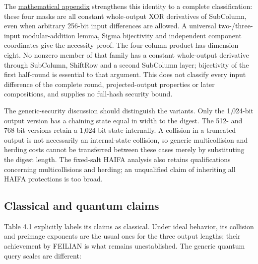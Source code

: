 \documentclass[
  english,
  11pt,
  a4paper,
]{article}
\begin{document}
The \href{SUBCOLUMN_STRUCTURES.md}{mathematical appendix} strengthens
this identity to a complete classification: these four masks are all
constant whole-output XOR derivatives of SubColumn, even when arbitrary
256-bit input differences are allowed. A universal two-/three-input
modular-addition lemma, Sigma bijectivity and independent component
coordinates give the necessity proof. The four-column product has
dimension eight. No nonzero member of that family has a constant
whole-output derivative through SubColumn, ShiftRow and a second
SubColumn layer; bijectivity of the first half-round is essential to
that argument. This does not classify every input difference of the
complete round, projected-output properties or later compositions, and
supplies no full-hash security bound.

The generic-security discussion should distinguish the variants. Only
the 1,024-bit output version has a chaining state equal in width to the
digest. The 512- and 768-bit versions retain a 1,024-bit state
internally. A collision in a truncated output is not necessarily an
internal-state collision, so generic multicollision and herding costs
cannot be transferred between these cases merely by substituting the
digest length. The fixed-salt HAIFA analysis also retains qualifications
concerning multicollisions and herding; an unqualified claim of
inheriting all HAIFA protections is too broad.


\subsection{Classical and quantum
claims}\label{classical-and-quantum-claims}

Table 4.1 explicitly labels its claims as classical. Under ideal
behavior, its collision and preimage exponents are the usual ones for
the three output lengths; their achievement by FEILIAN is what remains
unestablished. The generic quantum query scales are different:

\end{document}
